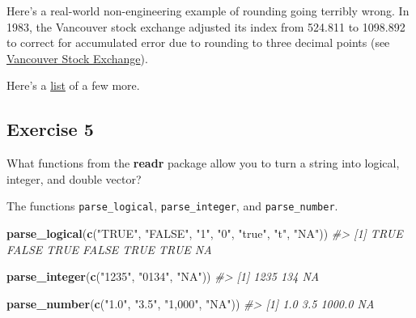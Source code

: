 \documentclass[]{book}
\newenvironment{Shaded}{\begin{snugshade}}{\end{snugshade}}
\newcommand{\CommentTok}[1]{\textcolor[rgb]{0.56,0.35,0.01}{\textit{#1}}}
\newcommand{\KeywordTok}[1]{\textcolor[rgb]{0.13,0.29,0.53}{\textbf{#1}}}
\newcommand{\NormalTok}[1]{#1}
\newcommand{\StringTok}[1]{\textcolor[rgb]{0.31,0.60,0.02}{#1}}
\theoremstyle{plain}
\theoremstyle{remark}
\theoremstyle{definition}
\theoremstyle{definition}
\theoremstyle{definition}
\theoremstyle{remark}
\begin{document}
Here's a real-world non-engineering example of rounding going terribly
wrong. In 1983, the Vancouver stock exchange adjusted its index from
524.811 to 1098.892 to correct for accumulated error due to rounding to
three decimal points (see
\href{https://en.wikipedia.org/wiki/Vancouver_Stock_Exchange}{Vancouver
Stock Exchange}).

Here's a
\href{https://www.ma.utexas.edu/users/arbogast/misc/disasters.html}{list}
of a few more.

\hypertarget{exercise-5-18}{%
\subsection{Exercise 5}\label{exercise-5-18}}

What functions from the \textbf{readr} package allow you to turn a
string into logical, integer, and double vector?

The functions \texttt{parse\_logical}, \texttt{parse\_integer}, and
\texttt{parse\_number}.

\begin{Shaded}
\begin{Highlighting}[]
\KeywordTok{parse_logical}\NormalTok{(}\KeywordTok{c}\NormalTok{(}\StringTok{"TRUE"}\NormalTok{, }\StringTok{"FALSE"}\NormalTok{, }\StringTok{"1"}\NormalTok{, }\StringTok{"0"}\NormalTok{, }\StringTok{"true"}\NormalTok{, }\StringTok{"t"}\NormalTok{, }\StringTok{"NA"}\NormalTok{))}
\CommentTok{#> [1]  TRUE FALSE  TRUE FALSE  TRUE  TRUE    NA}
\end{Highlighting}
\end{Shaded}

\begin{Shaded}
\begin{Highlighting}[]
\KeywordTok{parse_integer}\NormalTok{(}\KeywordTok{c}\NormalTok{(}\StringTok{"1235"}\NormalTok{, }\StringTok{"0134"}\NormalTok{, }\StringTok{"NA"}\NormalTok{))}
\CommentTok{#> [1] 1235  134   NA}
\end{Highlighting}
\end{Shaded}

\begin{Shaded}
\begin{Highlighting}[]
\KeywordTok{parse_number}\NormalTok{(}\KeywordTok{c}\NormalTok{(}\StringTok{"1.0"}\NormalTok{, }\StringTok{"3.5"}\NormalTok{, }\StringTok{"1,000"}\NormalTok{, }\StringTok{"NA"}\NormalTok{))}
\CommentTok{#> [1]    1.0    3.5 1000.0     NA}
\end{Highlighting}
\end{Shaded}
\end{document}
